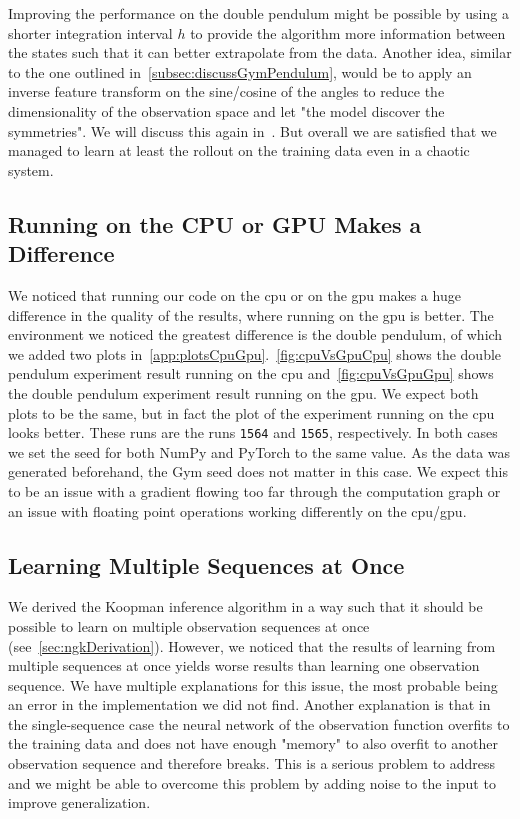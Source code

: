 		Improving the performance on the double pendulum might be possible by using a shorter integration interval \(h\) to provide the algorithm more information between the states such that it can better extrapolate from the data. Another idea, similar to the one outlined in~\autoref{subsec:discussGymPendulum}, would be to apply an inverse feature transform on the sine/cosine of the angles to reduce the dimensionality of the observation space and let "the model discover the symmetries". We will discuss this again in~. But overall we are satisfied that we managed to learn at least the rollout on the training data even in a chaotic system.

	\subsection{Running on the CPU or GPU Makes a Difference}
		\label{subsec:cpuGpu}

		We noticed that running our code on the \ac{cpu} or on the \ac{gpu} makes a huge difference in the quality of the results, where running on the \ac{gpu} is better. The environment we noticed the greatest difference is the double pendulum, of which we added two plots in~\autoref{app:plotsCpuGpu}.~\autoref{fig:cpuVsGpuCpu} shows the double pendulum experiment result running on the \ac{cpu} and~\autoref{fig:cpuVsGpuGpu} shows the double pendulum experiment result running on the \ac{gpu}. We expect both plots to be the same, but in fact the plot of the experiment running on the \ac{cpu} looks better. These runs are the runs \texttt{1564} and \texttt{1565}, respectively. In both cases we set the seed for both NumPy and PyTorch to the same value. As the data was generated beforehand, the Gym seed does not matter in this case. We expect this to be an issue with a gradient flowing too far through the computation graph or an issue with floating point operations working differently on the \ac{cpu}/\ac{gpu}.

	\subsection{Learning Multiple Sequences at Once}
		\label{subsec:singleMulti}

		We derived the Koopman inference algorithm in a way such that it should be possible to learn on multiple observation sequences at once (see~\autoref{sec:ngkDerivation}). However, we noticed that the results of learning from multiple sequences at once yields worse results than learning one observation sequence. We have multiple explanations for this issue, the most probable being an error in the implementation we did not find. Another explanation is that in the single-sequence case the neural network of the observation function overfits to the training data and does not have enough "memory" to also overfit to another observation sequence and therefore breaks. This is a serious problem to address and we might be able to overcome this problem by adding noise to the input to improve generalization.

